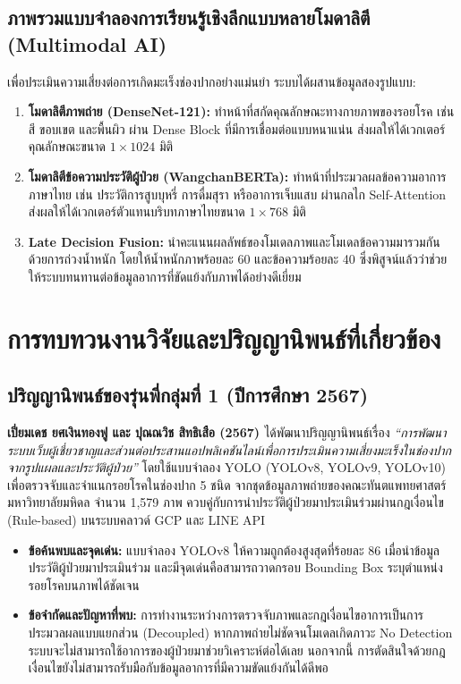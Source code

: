 \subsection{ภาพรวมแบบจำลองการเรียนรู้เชิงลึกแบบหลายโมดาลิตี (Multimodal AI)}
เพื่อประเมินความเสี่ยงต่อการเกิดมะเร็งช่องปากอย่างแม่นยำ ระบบได้ผสานข้อมูลสองรูปแบบ:
\begin{enumerate}
    \item \textbf{โมดาลิตีภาพถ่าย (DenseNet-121):} ทำหน้าที่สกัดคุณลักษณะทางกายภาพของรอยโรค เช่น สี ขอบเขต และพื้นผิว ผ่าน Dense Block ที่มีการเชื่อมต่อแบบหนาแน่น ส่งผลให้ได้เวกเตอร์คุณลักษณะขนาด $1 \times 1024$ มิติ
    \item \textbf{โมดาลิตีข้อความประวัติผู้ป่วย (WangchanBERTa):} ทำหน้าที่ประมวลผลข้อความอาการภาษาไทย เช่น ประวัติการสูบบุหรี่ การดื่มสุรา หรืออาการเจ็บแสบ ผ่านกลไก Self-Attention ส่งผลให้ได้เวกเตอร์ตัวแทนบริบทภาษาไทยขนาด $1 \times 768$ มิติ
    \item \textbf{Late Decision Fusion:} นำคะแนนผลลัพธ์ของโมเดลภาพและโมเดลข้อความมารวมกันด้วยการถ่วงน้ำหนัก โดยให้น้ำหนักภาพร้อยละ 60 และข้อความร้อยละ 40 ซึ่งพิสูจน์แล้วว่าช่วยให้ระบบทนทานต่อข้อมูลอาการที่ขัดแย้งกับภาพได้อย่างดีเยี่ยม
\end{enumerate}
\section{การทบทวนงานวิจัยและปริญญานิพนธ์ที่เกี่ยวข้อง}
\label{sec:literature_review_works}

\subsection{ปริญญานิพนธ์ของรุ่นพี่กลุ่มที่ 1 (ปีการศึกษา 2567)}
\textbf{เปี่ยมเดช ยศเงินทองฟู และ ปุณณวิช สิทธิเสือ (2567) \cite{piamdech2024oral}} ได้พัฒนาปริญญานิพนธ์เรื่อง \textit{``การพัฒนาระบบเว็บผู้เชี่ยวชาญและส่วนต่อประสานแอปพลิเคชันไลน์เพื่อการประเมินความเสี่ยงมะเร็งในช่องปากจากรูปแผลและประวัติผู้ป่วย''} โดยใช้แบบจำลอง YOLO (YOLOv8, YOLOv9, YOLOv10) เพื่อตรวจจับและจำแนกรอยโรคในช่องปาก 5 ชนิด จากชุดข้อมูลภาพถ่ายของคณะทันตแพทยศาสตร์ มหาวิทยาลัยมหิดล จำนวน 1,579 ภาพ ควบคู่กับการนำประวัติผู้ป่วยมาประเมินร่วมผ่านกฎเงื่อนไข (Rule-based) บนระบบคลาวด์ GCP และ LINE API
\begin{itemize}
    \item \textbf{ข้อค้นพบและจุดเด่น:} แบบจำลอง YOLOv8 ให้ความถูกต้องสูงสุดที่ร้อยละ 86 เมื่อนำข้อมูลประวัติผู้ป่วยมาประเมินร่วม และมีจุดเด่นคือสามารถวาดกรอบ Bounding Box ระบุตำแหน่งรอยโรคบนภาพได้ชัดเจน
    \item \textbf{ข้อจำกัดและปัญหาที่พบ:} การทำงานระหว่างการตรวจจับภาพและกฎเงื่อนไขอาการเป็นการประมวลผลแบบแยกส่วน (Decoupled) หากภาพถ่ายไม่ชัดจนโมเดลเกิดภาวะ No Detection ระบบจะไม่สามารถใช้อาการของผู้ป่วยมาช่วยวิเคราะห์ต่อได้เลย นอกจากนี้ การตัดสินใจด้วยกฎเงื่อนไขยังไม่สามารถรับมือกับข้อมูลอาการที่มีความขัดแย้งกันได้ดีพอ
\end{itemize}

